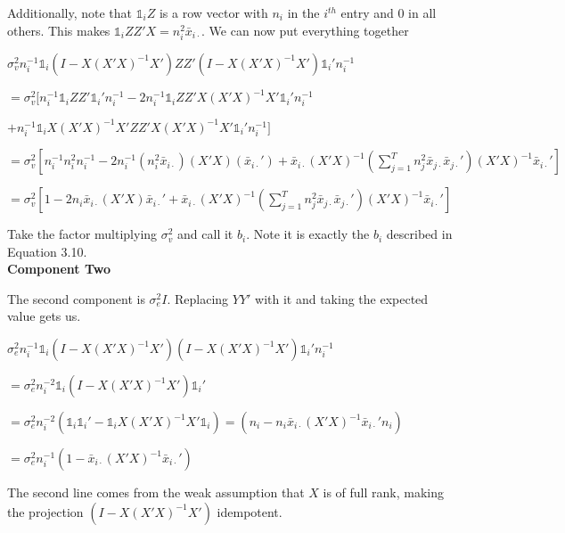 \documentclass[11pt,letter]{article}
\begin{document}
Additionally, note that $\mathds{1}_iZ$ is a row vector with $n_i$ in the $i^{th}$ entry and 0 in all others. This makes $\mathds{1}_iZZ'X=n_i^2\bar x_{i\cdot}$. We can now put everything together

\hspace{2cm}$\sigma^2_vn_i^{-1}\mathds{1}_i(I-X(X'X)^{-1}X')ZZ'(I-X(X'X)^{-1}X')\mathds{1}_i'n_i^{-1}$

\hspace{3cm}$=\sigma^2_v[n_i^{-1}\mathds{1}_iZZ'\mathds{1}_i'n^{-1}_i-2n_i^{-1}\mathds{1}_iZZ'X(X'X)^{-1}X'\mathds{1}_i'n^{-1}_i$

\hspace{5cm}$+n_i^{-1}\mathds{1}_iX(X'X)^{-1}X'ZZ'X(X'X)^{-1}X'\mathds{1}_i'n^{-1}_i]$

\hspace{3cm}$=\sigma^2_v[n_i^{-1}n_i^2n_i^{-1}-2n^{-1}_i(n_i^2\bar x_{i\cdot})(X'X)(\bar x_{i\cdot}')+\bar x_{i\cdot}(X'X)^{-1}(\sum_{j=1}^T n_j^2\bar x_{j\cdot}\bar x_{j\cdot}')(X'X)^{-1}\bar x_{i\cdot}']$

\hspace{3cm}$=\sigma^2_v[1-2n_i\bar x_{i\cdot}(X'X)\bar x_{i\cdot}'+\bar x_{i\cdot}(X'X)^{-1}(\sum_{j=1}^T n_j^2\bar x_{j\cdot}\bar x_{j\cdot}')(X'X)^{-1}\bar x_{i\cdot}']$

Take the factor multiplying $\sigma^2_v$ and call it $b_i$. Note it is exactly the $b_i$ described in Equation 3.10.\\

\textbf{Component Two}

The second component is $\sigma^2_eI$. Replacing $YY'$ with it and taking the expected value gets us.

\hspace{2cm}$\sigma^2_en_i^{-1}\mathds{1}_i(I-X(X'X)^{-1}X')(I-X(X'X)^{-1}X')\mathds{1}_i'n_i^{-1}$

\hspace{3cm}$=\sigma^2_en_i^{-2}\mathds{1}_i(I-X(X'X)^{-1}X')\mathds{1}_i'$

\hspace{3cm}$=\sigma^2_en_i^{-2}(\mathds{1}_i\mathds{1}_i'-\mathds{1}_iX(X'X)^{-1}X'\mathds{1}_i)= (n_i-n_i\bar x_{i\cdot}(X'X)^{-1}\bar x_{i\cdot}'n_i)$

\hspace{3cm}$=\sigma^2_en_i^{-1}(1-\bar x_{i\cdot}(X'X)^{-1}\bar x_{i\cdot}')$

The second line comes from the weak assumption that $X$ is of full rank, making the projection $(I-X(X'X)^{-1}X')$ idempotent.
\end{document}
